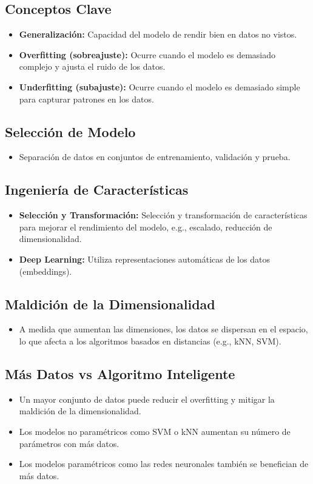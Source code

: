 \documentclass[a4paper, 11pt]{article}
\begin{document}
\subsection{Conceptos Clave}

\begin{itemize}
    \item \textbf{Generalización:} Capacidad del modelo de rendir bien en datos no vistos.
    \item \textbf{Overfitting (sobreajuste):} Ocurre cuando el modelo es demasiado complejo y ajusta el ruido de los datos.
    \item \textbf{Underfitting (subajuste):} Ocurre cuando el modelo es demasiado simple para capturar patrones en los datos.
\end{itemize}

\subsection{Selección de Modelo}
\begin{itemize}
    \item Separación de datos en conjuntos de entrenamiento, validación y prueba.
\end{itemize}

\subsection{Ingeniería de Características}
\begin{itemize}
    \item \textbf{Selección y Transformación:} Selección y transformación de características para mejorar el rendimiento del modelo, e.g., escalado, reducción de dimensionalidad.
    \item \textbf{Deep Learning:} Utiliza representaciones automáticas de los datos (embeddings).
\end{itemize}

\subsection{Maldición de la Dimensionalidad}
\begin{itemize}
    \item A medida que aumentan las dimensiones, los datos se dispersan en el espacio, lo que afecta a los algoritmos basados en distancias (e.g., kNN, SVM).
\end{itemize}

\subsection{Más Datos vs Algoritmo Inteligente}
\begin{itemize}
    \item Un mayor conjunto de datos puede reducir el overfitting y mitigar la maldición de la dimensionalidad.
    \item Los modelos no paramétricos como SVM o kNN aumentan su número de parámetros con más datos.
    \item Los modelos paramétricos como las redes neuronales también se benefician de más datos.
\end{itemize}
\end{document}
